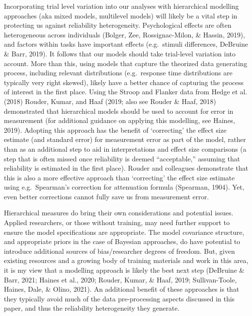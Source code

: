 \documentclass[
  english,
  man,floatsintext]{apa6}
\begin{document}
Incorporating trial level variation into our analyses with hierarchical modelling approaches (aka mixed models, multilevel models) will likely be a vital step in protecting us against reliability heterogeneity. Psychological effects are often heterogeneous across individuals (Bolger, Zee, Rossignac-Milon, \& Hassin, 2019), and factors within tasks have important effects (e.g.~stimuli differences, DeBruine \& Barr, 2019). It follows that our models should take trial-level variation into account. More than this, using models that capture the theorized data generating process, including relevant distributions (e.g.~response time distributions are typically very right skewed), likely have a better chance of capturing the process of interest in the first place. Using the Stroop and Flanker data from Hedge et al. (2018) Rouder, Kumar, and Haaf (2019; also see Rouder \& Haaf, 2018) demonstrated that hierarchical models should be used to account for error in measurement (for additional guidance on applying this modelling, see Haines, 2019). Adopting this approach has the benefit of `correcting' the effect size estimate (and standard error) for measurement error as part of the model, rather than as an additional step to aid in interpretations and effect size comparisons (a step that is often missed once reliability is deemed ``acceptable,'' assuming that reliability is estimated in the first place). Rouder and colleagues demonstrate that this is also a more effective approach than `correcting' the effect size estimate using e.g.~Spearman's correction for attenuation formula (Spearman, 1904). Yet, even better corrections cannot fully save us from measurement error.

Hierarchical measures do bring their own considerations and potential issues. Applied researchers, or those without training, may need further support to ensure the model specifications are appropriate. The model covariance structure, and appropriate priors in the case of Bayesian approaches, do have potential to introduce additional sources of bias/researcher degrees of freedom. But, given existing resources and a growing body of training materials and work in this area, it is my view that a modelling approach is likely the best next step (DeBruine \& Barr, 2021; Haines et al., 2020; Rouder, Kumar, \& Haaf, 2019; Sullivan-Toole, Haines, Dale, \& Olino, 2021). An additional benefit of these approaches is that they typically avoid much of the data pre-processing aspects discussed in this paper, and thus the reliability heterogeneity they generate.
\end{document}
